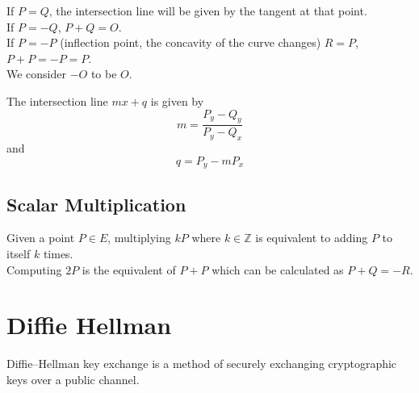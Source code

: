 \documentclass{article}
\begin{document}
If \(P=Q\), the intersection line will be given by the tangent at that point.\\
If \(P=-Q\), \(P+Q=O\).\\
If \(P=-P\) (inflection point, the concavity of the curve changes) \(R=P\), \(P+P=-P=P\).\\
We consider \(-O\) to be \(O\).

The intersection line \(mx+q\) is given by
\[
	m=\frac{P_y-Q_y}{P_y-Q_x}
\]
and
\[
	q=P_y-mP_x
\]

\begin{center}
\end{center}

\subsection{Scalar Multiplication}

Given a point \(P\in E\), multiplying \(kP\) where \(k\in\mathbb{Z}\) is equivalent to adding \(P\) to itself \(k\) times.\\
Computing \(2P\) is the equivalent of \(P+P\) which can be calculated as \(P+Q=-R\).

\pagebreak

\section{Diffie Hellman}

Diffie–Hellman key exchange is a method of securely exchanging cryptographic keys over a public channel.
\end{document}
